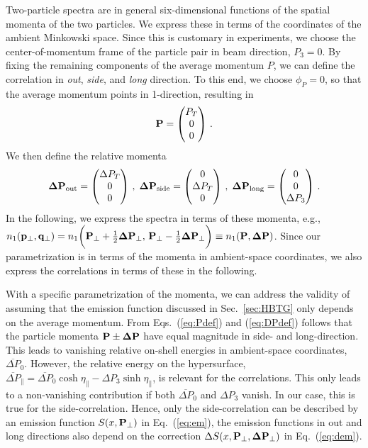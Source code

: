 \documentclass[reprint,superscriptaddress,english,preprintnumbers,amsmath,amssymb,aps,prx]{revtex4-2}
\def\eq#1{(\ref{#1})}
\def\Eq#1{Eq.~(\ref{#1})}
\def\Sec#1{Sec.~\ref{#1}}
\begin{document}
Two-particle spectra are in general six-dimensional functions of the spatial momenta of the two particles. We express these in terms of the coordinates of the ambient Minkowski space. Since this is customary in experiments, we choose the center-of-momentum frame of the particle pair in beam direction, $P_3 = 0$. By fixing the remaining components of the average momentum $P$, we can define the correlation in \emph{out}, \emph{side}, and \emph{long} direction. To this end, we choose $\phi_P = 0$, so that the average momentum points in 1-direction, resulting in
\begin{align}\label{eq:Pdef}
\bold{P} = \begin{pmatrix} P_T\\ 0\\ 0 \end{pmatrix}\,.
\end{align}
We then define the relative momenta
\begin{align}\label{eq:DPdef}
\bold{\Delta P}_{\rm out} = \begin{pmatrix} \Delta P_T \\ 0 \\ 0 \end{pmatrix}\,,\;
\bold{\Delta P}_{\rm side} = \begin{pmatrix} 0 \\ \Delta P_T \\ 0 \end{pmatrix}\,,\;
\bold{\Delta P}_{\rm long} = \begin{pmatrix} 0 \\ 0 \\ \Delta P_3 \end{pmatrix}\,.
\end{align}
In the following, we express the spectra in terms of these momenta, e.g., $n_1(\bold{p}_\perp,\bold{q}_\perp) = n_1\bigg(\bold{P}_\perp+\frac{1}{2}\bold{\Delta P}_\perp,\,\bold{P}_\perp-\frac{1}{2}\bold{\Delta P}_\perp\bigg) \equiv n_1(\bold{P},\bold{\Delta P})$.
Since our parametrization is in terms of the momenta in ambient-space coordinates, we also express the correlations in terms of these in the following.

With a specific parametrization of the momenta, we can address the validity of assuming that the emission function discussed in \Sec{sec:HBTG} only depends on the average momentum. From Eqs.\ \eq{eq:Pdef} and \eq{eq:DPdef} follows that the particle momenta $\bold{P}\pm \bold{\Delta P}$ have equal magnitude in side- and long-direction. This leads to vanishing relative on-shell energies in ambient-space coordinates, $\overline{\Delta P}_0$. However, the relative energy on the hypersurface, $\overline{\Delta P}_\parallel = \overline{\Delta P}_0 \cosh \eta_\parallel - \Delta P_3 \sinh\eta_\parallel$, is relevant for the correlations. This only leads to a non-vanishing contribution if both $\overline{\Delta P}_0$ and $\Delta P_3$ vanish. In our case, this is true for the side-correlation. Hence, only the side-correlation can be described by an emission function $S(x,\bold{P}_\perp)$ in \Eq{eq:em}, the emission functions in out and long directions also depend on the correction $\Delta S(x,\bold{P}_\perp,\bold{\Delta P}_\perp)$ in \Eq{eq:dem}. 
\end{document}
